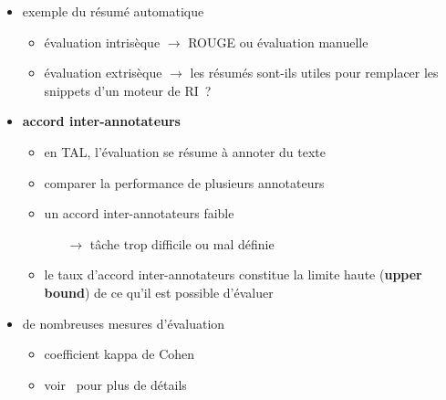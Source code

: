 \begin{frame}[allowframebreaks]
\begin{itemize}
    \item exemple du résumé automatique
    \begin{itemize}
        \item évaluation intrisèque $\to$ ROUGE ou évaluation manuelle
        \item évaluation extrisèque $\to$ les résumés sont-ils utiles pour 
              remplacer les snippets d'un moteur de RI~?
    \end{itemize}

    \framebreak

    \item \textbf{accord inter-annotateurs}
    \begin{itemize}
        \item en TAL, l'évaluation se résume à annoter du texte
        \item comparer la performance de plusieurs annotateurs
        \item un accord inter-annotateurs faible
        \begin{itemize}
            \item[$\to$] tâche trop difficile ou mal définie
        \end{itemize}
        \item le taux d'accord inter-annotateurs constitue la limite haute 
              (\textbf{upper bound}) de ce qu'il est possible d'évaluer
    \end{itemize}

    \item de nombreuses mesures d'évaluation
    \begin{itemize}
        \item coefficient kappa de Cohen
        \item voir~\cite{artstein2008inter} pour plus de détails
    \end{itemize}

\end{itemize}

\end{frame}


